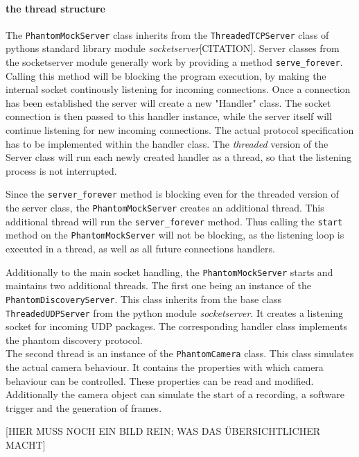 \paragraph{the thread structure}
The \texttt{PhantomMockServer} class inherits from the \texttt{ThreadedTCPServer} class of pythons standard library module \textit{socketserver}[CITATION]. Server classes from the socketserver module generally work by providing a method \texttt{serve\_forever}. Calling this method will be blocking the program execution, by making the internal socket continously listening for incoming connections. Once a connection has been established the server will create a new "Handler" class. The socket connection is then passed to this handler instance, while the server itself will continue listening for new incoming connections. The actual protocol specification has to be implemented within the handler class. The \textit{threaded} version of the Server class will run each newly created handler as a thread, so that the listening process is not interrupted.\par 
Since the \texttt{server\_forever} method is blocking even for the threaded version of the server class, the \texttt{PhantomMockServer} creates an additional thread. This additional thread will run the \texttt{server\_forever} method. Thus calling the \texttt{start} method on the \texttt{PhantomMockServer} will not be blocking, as the listening loop is executed in a thread, as well as all future connections handlers.\par
Additionally to the main socket handling, the \texttt{PhantomMockServer} starts and maintains two additional threads. The first one being an instance of the \texttt{PhantomDiscoveryServer}. This class inherits from the base class \texttt{ThreadedUDPServer} from the python module \textit{socketserver}. It creates a listening socket for incoming UDP packages. The corresponding handler class implements the phantom discovery protocol.\\ The second thread is an instance of the \texttt{PhantomCamera} class. This class simulates the actual camera behaviour. It contains the properties with which camera behaviour can be controlled. These properties can be read and modified. Additionally the camera object can simulate the start of a recording, a software trigger and the generation of frames. 

[HIER MUSS NOCH EIN BILD REIN; WAS DAS ÜBERSICHTLICHER MACHT]

